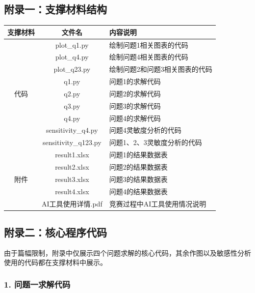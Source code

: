 \documentclass[12pt,a4paper]{article}
\begin{document}
\subsection*{附录一：支撑材料结构}
\begin{table}[htbp]
    \centering
    \renewcommand{\arraystretch}{1.35}
    \begin{tabularx}{\textwidth}{|c|c|X|}
        \hline
        \textbf{支撑材料} & \textbf{文件名} & \textbf{内容说明} \\
        \hline
        \multirow{9}{*}{代码} & plot\_q1.py & 绘制问题1相关图表的代码 \\
        \cline{2-3}
         & plot\_q4.py & 绘制问题4相关图表的代码 \\
        \cline{2-3}
         & plot\_q23.py & 绘制问题2和问题3相关图表的代码 \\
        \cline{2-3}
         & q1.py & 问题1的求解代码 \\
        \cline{2-3}
         & q2.py & 问题2的求解代码 \\
        \cline{2-3}
         & q3.py & 问题3的求解代码 \\
        \cline{2-3}
         & q4.py & 问题4的求解代码 \\
        \cline{2-3}
         & sensitivity\_q4.py & 问题4灵敏度分析的代码 \\
        \cline{2-3}
         & sensitivity\_q123.py & 问题1、2、3灵敏度分析的代码 \\
        \hline
        \multirow{5}{*}{附件} & result1.xlsx & 问题1的结果数据表 \\
        \cline{2-3}
         & result2.xlsx & 问题2的结果数据表 \\
        \cline{2-3}
         & result3.xlsx & 问题3的结果数据表 \\
        \cline{2-3}
         & result4.xlsx & 问题4的结果数据表 \\
        \hline
         & AI工具使用详情.pdf & 竞赛过程中AI工具使用情况说明 \\
        \hline
    \end{tabularx}
\end{table}

\subsection*{附录二：核心程序代码}
由于篇幅限制，附录中仅展示四个问题求解的核心代码，其余作图以及敏感性分析使用的代码都在支撑材料中展示。
\subsubsection*{1. 问题一求解代码}
\end{document}
